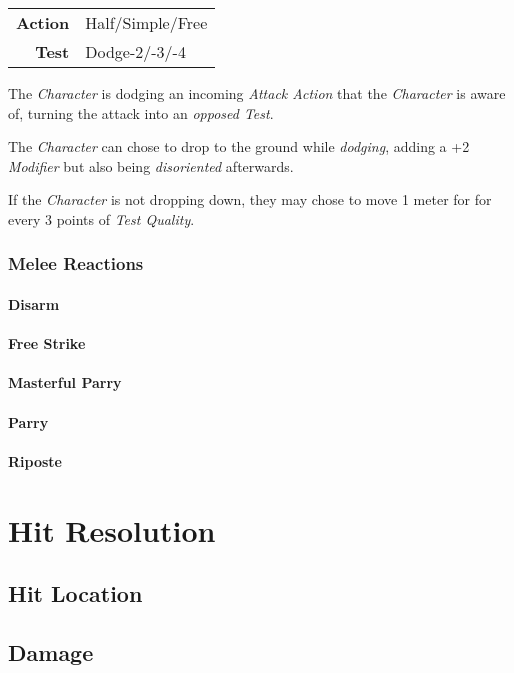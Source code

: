 \begin{tabular}{rl}
    \textbf{Action} & Half/Simple/Free \\
    \textbf{Test}   & Dodge-2/-3/-4    \\
\end{tabular}

\hfill

The \emph{Character} is dodging an incoming \emph{Attack Action} that the
\emph{Character} is aware of, turning the attack into an \emph{opposed Test}.

The \emph{Character} can chose to drop to the ground while \emph{dodging},
adding a +2 \emph{Modifier} but also being \emph{disoriented} afterwards.

If the \emph{Character} is not dropping down, they may chose to move 1 meter
for for every 3 points of \emph{Test Quality}.

\subsubsection{Melee Reactions}

\paragraph{Disarm}

\paragraph{Free Strike}

\paragraph{Masterful Parry}

\paragraph{Parry}

\paragraph{Riposte}

\section{Hit Resolution}

\subsection{Hit Location}

\subsection{Damage}